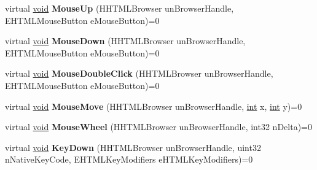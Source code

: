 \begin{DoxyCompactItemize}
\item 
\hypertarget{classISteamHTMLSurface_a724ad6ccdbb026c08c14fd534ef658cf}{}virtual \hyperlink{SDL__audio_8h_a52835ae37c4bb905b903cbaf5d04b05f}{void} {\bfseries Mouse\+Up} (H\+H\+T\+M\+L\+Browser un\+Browser\+Handle, E\+H\+T\+M\+L\+Mouse\+Button e\+Mouse\+Button)=0\label{classISteamHTMLSurface_a724ad6ccdbb026c08c14fd534ef658cf}

\item 
\hypertarget{classISteamHTMLSurface_ae3956fc0d0c5994e5912c540ebc1bc81}{}virtual \hyperlink{SDL__audio_8h_a52835ae37c4bb905b903cbaf5d04b05f}{void} {\bfseries Mouse\+Down} (H\+H\+T\+M\+L\+Browser un\+Browser\+Handle, E\+H\+T\+M\+L\+Mouse\+Button e\+Mouse\+Button)=0\label{classISteamHTMLSurface_ae3956fc0d0c5994e5912c540ebc1bc81}

\item 
\hypertarget{classISteamHTMLSurface_ac03609b36de485199a10db0b3e10437e}{}virtual \hyperlink{SDL__audio_8h_a52835ae37c4bb905b903cbaf5d04b05f}{void} {\bfseries Mouse\+Double\+Click} (H\+H\+T\+M\+L\+Browser un\+Browser\+Handle, E\+H\+T\+M\+L\+Mouse\+Button e\+Mouse\+Button)=0\label{classISteamHTMLSurface_ac03609b36de485199a10db0b3e10437e}

\item 
\hypertarget{classISteamHTMLSurface_adcfad4756dd83a4301ebebffa4f72572}{}virtual \hyperlink{SDL__audio_8h_a52835ae37c4bb905b903cbaf5d04b05f}{void} {\bfseries Mouse\+Move} (H\+H\+T\+M\+L\+Browser un\+Browser\+Handle, \hyperlink{SDL__thread_8h_a6a64f9be4433e4de6e2f2f548cf3c08e}{int} x, \hyperlink{SDL__thread_8h_a6a64f9be4433e4de6e2f2f548cf3c08e}{int} y)=0\label{classISteamHTMLSurface_adcfad4756dd83a4301ebebffa4f72572}

\item 
\hypertarget{classISteamHTMLSurface_a7b234824c28b9625b86736586878dd52}{}virtual \hyperlink{SDL__audio_8h_a52835ae37c4bb905b903cbaf5d04b05f}{void} {\bfseries Mouse\+Wheel} (H\+H\+T\+M\+L\+Browser un\+Browser\+Handle, int32 n\+Delta)=0\label{classISteamHTMLSurface_a7b234824c28b9625b86736586878dd52}

\item 
\hypertarget{classISteamHTMLSurface_aa942c45c6905a6f092a6f2b2d5f6611a}{}virtual \hyperlink{SDL__audio_8h_a52835ae37c4bb905b903cbaf5d04b05f}{void} {\bfseries Key\+Down} (H\+H\+T\+M\+L\+Browser un\+Browser\+Handle, uint32 n\+Native\+Key\+Code, E\+H\+T\+M\+L\+Key\+Modifiers e\+H\+T\+M\+L\+Key\+Modifiers)=0\label{classISteamHTMLSurface_aa942c45c6905a6f092a6f2b2d5f6611a}


\end{DoxyCompactItemize}
